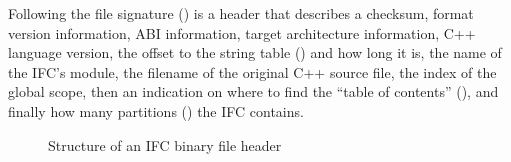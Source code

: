 Following the file signature () is a header that describes a checksum, 
format version information, ABI information, target architecture information, C++ language version,
 the offset to the string table () and how long it is, 
the name of the IFC's module, the filename of the original C++ source file, the index of the global scope,
then an indication on
where to find the ``table of contents'' (), and finally how many partitions ()
the IFC contains.
%
\begin{figure}[H]
  \centering
  \caption{Structure of an IFC binary file header}
  \label{fig:ifc-file-header}
\end{figure}

